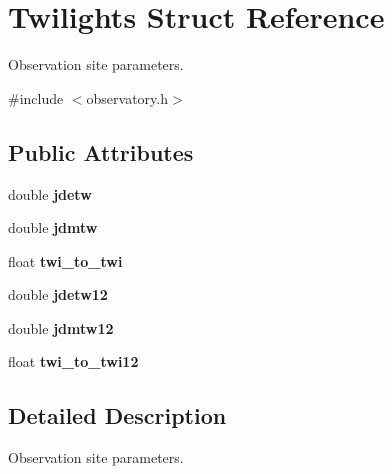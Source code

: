 \hypertarget{struct_twilights}{\section{Twilights Struct Reference}
\label{struct_twilights}
}


Observation site parameters.  




{\ttfamily \#include $<$observatory.\-h$>$}

\subsection*{Public Attributes}
\begin{DoxyCompactItemize}
\item 
\hypertarget{struct_twilights_ab685f41ad84e5efd3d33cabd805cd1cb}{double {\bfseries jdetw}}\label{struct_twilights_ab685f41ad84e5efd3d33cabd805cd1cb}

\item 
\hypertarget{struct_twilights_a740996a218b02bb2ac6a04d99606cdc4}{double {\bfseries jdmtw}}\label{struct_twilights_a740996a218b02bb2ac6a04d99606cdc4}

\item 
\hypertarget{struct_twilights_a6d051a19e047f10e5732d5376e17a681}{float {\bfseries twi\-\_\-to\-\_\-twi}}\label{struct_twilights_a6d051a19e047f10e5732d5376e17a681}

\item 
\hypertarget{struct_twilights_acc9f6987d1f9681ff2f067788fe9476c}{double {\bfseries jdetw12}}\label{struct_twilights_acc9f6987d1f9681ff2f067788fe9476c}

\item 
\hypertarget{struct_twilights_a0926cbf8aaa1d2d78f5ab7491943aa1b}{double {\bfseries jdmtw12}}\label{struct_twilights_a0926cbf8aaa1d2d78f5ab7491943aa1b}

\item 
\hypertarget{struct_twilights_a4b95ca62f36d162319514c4fdafeeb6c}{float {\bfseries twi\-\_\-to\-\_\-twi12}}\label{struct_twilights_a4b95ca62f36d162319514c4fdafeeb6c}

\end{DoxyCompactItemize}


\subsection{Detailed Description}
Observation site parameters. 

